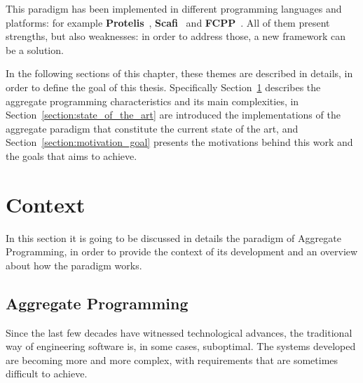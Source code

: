This paradigm has been implemented in different programming languages and platforms: for example \textbf{Protelis}~\cite{protelis_introduction}, \textbf{Scafi}~\cite{scafi_introduction} and \textbf{FCPP}~\cite{fcpp_introduction}. All of them present strengths, but also weaknesses: in order to address those, a new framework can be a solution.

In the following sections of this chapter, these themes are described in details, in order to define the goal of this thesis. Specifically Section~\ref{section:aggregate_programming_introduction} describes the aggregate programming characteristics and its main complexities, in Section~\ref{section:state_of_the_art} are introduced the implementations of the aggregate paradigm that constitute the current state of the art, and Section~\ref{section:motivation_goal} presents the motivations behind this work and the goals that aims to achieve.

\section{Context}\label{section:aggregate_programming_introduction}
In this section it is going to be discussed in details the paradigm of Aggregate Programming, in order to provide the context of its development and an overview about how the paradigm works.

\subsection{Aggregate Programming}
Since the last few decades have witnessed technological advances, the traditional way of engineering software is, in some cases, suboptimal.\newline
The systems developed are becoming more and more complex, with requirements that are sometimes difficult to achieve. 

